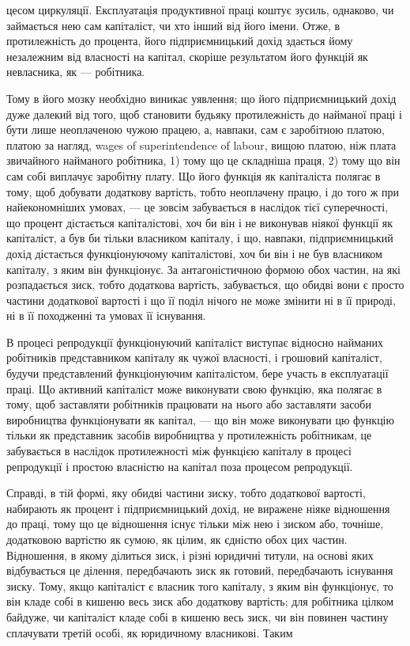 цесом циркуляції. Експлуатація продуктивної праці коштує зусиль,
однаково, чи займається нею сам капіталіст, чи хто інший від його
імени. Отже, в протилежність до процента, його підприємницький
дохід здається йому незалежним від власності на капітал,
скоріше результатом його функцій як невласника, як — робітника.

Тому в його мозку необхідно виникає уявлення; що його підприємницький
дохід дуже далекий від того, щоб становити будьяку
протилежність до найманої праці і бути лише неоплаченою чужою
працею, а, навпаки, сам є заробітною платою, платою за нагляд,
wages of superintendence of labour, вищою платою, ніж плата звичайного
найманого робітника, 1) тому що це складніша праця, 2)
тому що він сам собі виплачує заробітну плату. Що його функція
як капіталіста полягає в тому, щоб добувати додаткову вартість,
тобто неоплачену працю, і до того ж при найекономніших умовах,
— це зовсім забувається в наслідок тієї суперечності, що процент
дістається капіталістові, хоч би він і не виконував ніякої
функції як капіталіст, а був би тільки власником капіталу, і що,
навпаки, підприємницький дохід дістається функціонуючому капіталістові,
хоч би він і не був власником капіталу, з яким він
функціонує. За антагоністичною формою обох частин, на які
розпадається зиск, тобто додаткова вартість, забувається, що
обидві вони є просто частини додаткової вартості і що її поділ
нічого не може змінити ні в її природі, ні в її походженні та
умовах її існування.

В процесі репродукції функціонуючий капіталіст виступає
відносно найманих робітників представником капіталу як чужої
власності, і грошовий капіталіст, будучи представлений функціонуючим
капіталістом, бере участь в експлуатації праці. Що
активний капіталіст може виконувати свою функцію, яка полягає
в тому, щоб заставляти робітників працювати на нього або
заставляти засоби виробництва функціонувати як капітал, — що
він може виконувати цю функцію тільки як представник засобів
виробництва у протилежність робітникам, це забувається
в наслідок протилежності між функцією капіталу в процесі
репродукції і простою власністю на капітал поза процесом
репродукції.

Справді, в тій формі, яку обидві частини зиску, тобто додаткової
вартості, набирають як процент і підприємницький дохід,
не виражене ніяке відношення до праці, тому що це відношення
існує тільки між нею і зиском або, точніше, додатковою вартістю
як сумою, як цілим, як єдністю обох цих частин. Відношення, в
якому ділиться зиск, і різні юридичні титули, на основі яких відбувається
це ділення, передбачають зиск як готовий, передбачають
існування зиску. Тому, якщо капіталіст є власник того капіталу,
з яким він функціонує, то він кладе собі в кишеню весь зиск
або додаткову вартість; для робітника цілком байдуже, чи капіталіст
кладе собі в кишеню весь зиск, чи він повинен частину
сплачувати третій особі, як юридичному власникові. Таким
